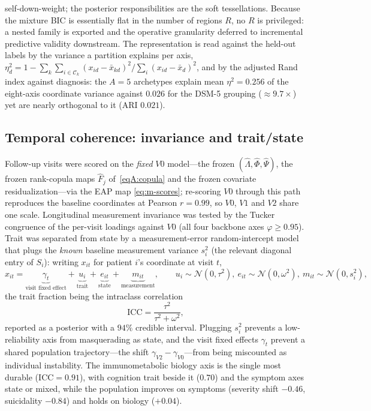 self-down-weight; the posterior responsibilities are the soft tessellations. Because the
mixture BIC is essentially flat in the number of regions $R$, no $R$ is privileged: a nested
family is exported and the operative granularity deferred to incremental predictive validity
downstream. The representation is read against the held-out labels by the variance a partition
explains per axis,
$\eta^{2}_{d}=1-\sum_{k}\sum_{i\in\mathcal C_k}(x_{id}-\bar x_{kd})^{2}\big/\sum_i(x_{id}-\bar x_d)^{2}$,
and by the adjusted Rand index against diagnosis: the $A=5$ archetypes explain mean
$\eta^{2}=0.256$ of the eight-axis coordinate variance against $0.026$ for the DSM-5 grouping
($\approx9.7\times$) yet are nearly orthogonal to it (ARI $0.021$).

\subsection{Temporal coherence: invariance and trait/state}

Follow-up visits were scored on the \emph{fixed} $V0$ model---the frozen
$(\hat\Lambda,\hat\Phi,\hat\Psi)$, the frozen rank-copula maps $\hat F_j$ of~\eqref{eqA:copula}
and the frozen covariate residualization---via the EAP map \eqref{eq:m-scores}; re-scoring
$V0$ through this path reproduces the baseline coordinates at Pearson $r=0.99$, so $V0$, $V1$
and $V2$ share one scale. Longitudinal measurement invariance was tested by the Tucker
congruence of the per-visit loadings against $V0$ (all four backbone axes $\varphi\ge0.95$).
Trait was separated from state by a measurement-error random-intercept model that plugs the
\emph{known} baseline measurement variance $s_i^{2}$ (the relevant diagonal entry of $S_i$):
writing $x_{it}$ for patient $i$'s coordinate at visit $t$,
\begin{equation}
  x_{it}=\underbrace{\gamma_t}_{\text{visit fixed effect}}
  +\underbrace{u_i}_{\text{trait}}+\underbrace{e_{it}}_{\text{state}}
  +\underbrace{m_{it}}_{\text{measurement}},\qquad
  u_i\sim\mathcal N(0,\tau^{2}),\ e_{it}\sim\mathcal N(0,\omega^{2}),\ m_{it}\sim\mathcal N(0,s_i^{2}),
  \label{eq:m-trait}
\end{equation}
the trait fraction being the intraclass correlation
\begin{equation}
  \mathrm{ICC}=\frac{\tau^{2}}{\tau^{2}+\omega^{2}},
  \label{eq:m-icc}
\end{equation}
reported as a posterior with a $94\%$ credible interval. Plugging $s_i^{2}$ prevents a
low-reliability axis from masquerading as state, and the visit fixed effects $\gamma_t$
prevent a shared population trajectory---the shift $\gamma_{V2}-\gamma_{V0}$---from being
miscounted as individual instability. The immunometabolic biology axis is the single most
durable ($\mathrm{ICC}=0.91$), with cognition trait beside it ($0.70$) and the symptom axes
state or mixed, while the population improves on symptoms (severity shift $-0.46$, suicidality
$-0.84$) and holds on biology ($+0.04$).

